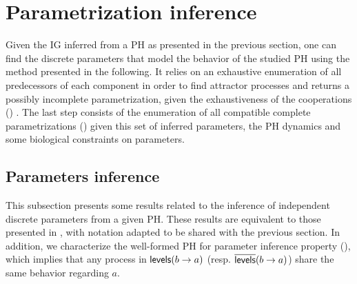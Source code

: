 \section{Parametrization inference}\label{sec:infer-K}

Given the IG inferred from a PH as presented in the previous section, one can find the discrete parameters
that model the behavior of the studied PH using the method presented in the following.
It relies on an exhaustive enumeration of all predecessors of each component in order to find attractor processes
and returns a possibly incomplete parametrization, given the exhaustiveness of the cooperations ()
.
The last step consists of the enumeration of all compatible complete parametrizations () given this
set of inferred parameters, the PH dynamics and some biological constraints on parameters.


\subsection{Parameters inference}\label{ssec:infer-K}

This subsection presents some results related to the inference of independent discrete parameters from a given PH.
These results are equivalent to those presented in \cite{PMR10-TCSB}, with notation adapted to be shared with the previous section.
In addition, we characterize the well-formed PH for parameter inference property (),
which implies that %
any process in $\mathsf{levels}(b\rightarrow a)$ (resp. $\overline{\mathsf{levels}}(b\rightarrow a)$) share the same behavior
regarding $a$.


